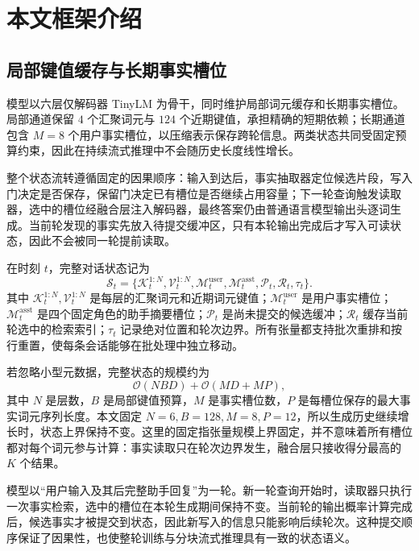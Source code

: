 \documentclass[letterpaper]{article}
\begin{document}
\section{本文框架介绍}

\subsection{局部键值缓存与长期事实槽位}

模型以六层仅解码器 TinyLM 为骨干，同时维护局部词元缓存和长期事实槽位。局部通道保留 $4$ 个汇聚词元与 $124$ 个近期键值，承担精确的短期依赖；长期通道包含 $M=8$ 个用户事实槽位，以压缩表示保存跨轮信息。两类状态共同受固定预算约束，因此在持续流式推理中不会随历史长度线性增长。

整个状态流转遵循固定的因果顺序：输入到达后，事实抽取器定位候选片段，写入门决定是否保存，保留门决定已有槽位是否继续占用容量；下一轮查询触发读取器，选中的槽位经融合层注入解码器，最终答案仍由普通语言模型输出头逐词生成。当前轮发现的事实先放入待提交缓冲区，只有本轮输出完成后才写入可读状态，因此不会被同一轮提前读取。

在时刻 $t$，完整对话状态记为
\begin{equation}
\mathcal{S}_t=\{\mathcal{K}^{1:N}_t,\mathcal{V}^{1:N}_t,
\mathcal{M}^{\mathrm{user}}_t,\mathcal{M}^{\mathrm{asst}}_t,
\mathcal{P}_t,\mathcal{R}_t,\tau_t\}.
\end{equation}
其中 $\mathcal{K}^{1:N}_t,\mathcal{V}^{1:N}_t$ 是每层的汇聚词元和近期词元键值；$\mathcal{M}^{\mathrm{user}}_t$ 是用户事实槽位；$\mathcal{M}^{\mathrm{asst}}_t$ 是四个固定角色的助手摘要槽位；$\mathcal{P}_t$ 是尚未提交的候选缓冲；$\mathcal{R}_t$ 缓存当前轮选中的检索索引；$\tau_t$ 记录绝对位置和轮次边界。所有张量都支持批次重排和按行重置，使每条会话能够在批处理中独立移动。

若忽略小型元数据，完整状态的规模约为
\begin{equation}
\mathcal{O}(NBD)+\mathcal{O}(MD+MP),
\end{equation}
其中 $N$ 是层数，$B$ 是局部键值预算，$M$ 是事实槽位数，$P$ 是每槽位保存的最大事实词元序列长度。本文固定 $N=6,B=128,M=8,P=12$，所以生成历史继续增长时，状态上界保持不变。这里的固定指张量规模上界固定，并不意味着所有槽位都对每个词元参与计算：事实读取只在轮次边界发生，融合层只接收得分最高的 $K$ 个结果。

模型以“用户输入及其后完整助手回复”为一轮。新一轮查询开始时，读取器只执行一次事实检索，选中的槽位在本轮生成期间保持不变。当前轮的输出概率计算完成后，候选事实才被提交到状态，因此新写入的信息只能影响后续轮次。这种提交顺序保证了因果性，也使整轮训练与分块流式推理具有一致的状态语义。
\end{document}
